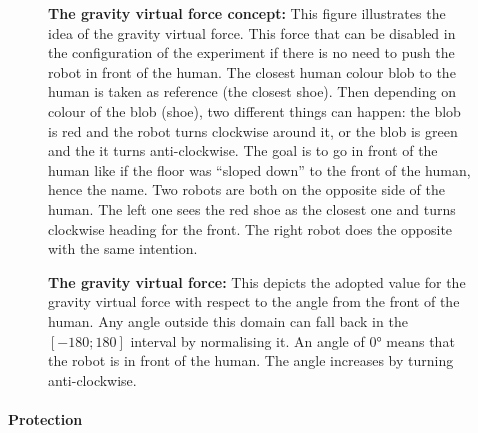 \documentclass[oneside, a4paper, 12pt]{memoir}
\let\oldCaption\caption
\renewcommand{\caption}[2]{
\oldCaption[#1]{{\small\sffamily\bfseries #1:} #2}
}
\begin{document}
\begin{itemize}
\begin{figure}[!htp]
					\caption{The gravity virtual force concept}{This figure illustrates the idea of the gravity virtual force. This force that can be disabled in the configuration of the experiment if there is no need to push the robot in front of the human. The closest human colour blob to the human is taken as reference (the closest shoe). Then depending on colour of the blob (shoe), two different things can happen: the blob is red and the robot turns clockwise around it, or the blob is green and the it turns anti-clockwise. The goal is to go in front of the human like if the floor was \enquote{sloped down} to the front of the human, hence the name. Two robots are both on the opposite side of the human. The left one sees the red shoe as the closest one and turns clockwise heading for the front. The right robot does the opposite with the same intention.}
					\label{fig:gravity_force_idea}
				\end{figure}
				
				\begin{figure}[!htp]\centering
					
					\caption{The gravity virtual force}{This depicts the adopted value for the gravity virtual force with respect to the angle from the front of the human. Any angle outside this domain can fall back in the $[-180;180]$ interval by normalising it. An angle of 0° means that the robot is in front of the human. The angle increases by turning anti-clockwise.}
					\label{fig:gravity_force}
				\end{figure}
			\end{itemize}
			
		
			\paragraph{Protection}
			
\end{document}
